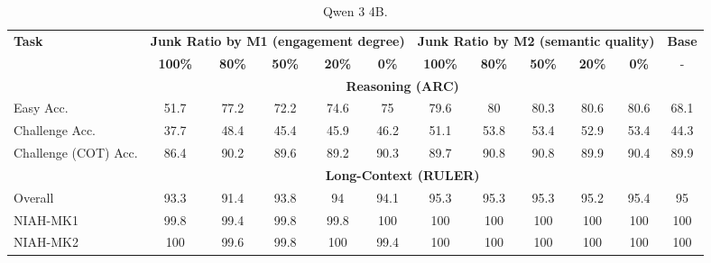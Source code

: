 \begin{table}[ht]
\centering
\scriptsize
\caption{Qwen 3 4B.}
\label{tab:benchmark_qwen3_4b_full}
\setlength{\tabcolsep}{6pt}
\begin{tabular}{l|ccccc|ccccc|c}
\toprule
\multirow{2}{*}{\textbf{Task}}  & \multicolumn{5}{c|}{\textbf{Junk Ratio by M1 (engagement degree)}} & \multicolumn{5}{c|}{\textbf{Junk Ratio by M2 (semantic quality)}} & \textbf{Base} \\
 & \textbf{100\%} & \textbf{80\%} & \textbf{50\%} & \textbf{20\%} & \textbf{0\%} & \textbf{100\%} & \textbf{80\%} & \textbf{50\%} & \textbf{20\%} & \textbf{0\%} & - \\
\midrule
&\multicolumn{10}{c}{\textbf{Reasoning (ARC)}}\\
Easy Acc. & \cellcolor{myred!90} 51.7 & \cellcolor{royalblue!50} 77.2 & \cellcolor{royalblue!22} 72.2 & \cellcolor{royalblue!35} 74.6 & \cellcolor{royalblue!38} 75 & \cellcolor{royalblue!63} 79.6 & \cellcolor{royalblue!65} 80 & \cellcolor{royalblue!67} 80.3 & \cellcolor{royalblue!68} 80.6 & \cellcolor{royalblue!68} 80.6 & 68.1 \\
Challenge Acc. & \cellcolor{myred!62} 37.7 & \cellcolor{royalblue!39} 48.4 & \cellcolor{royalblue!11} 45.4 & \cellcolor{royalblue!15} 45.9 & \cellcolor{royalblue!19} 46.2 & \cellcolor{royalblue!65} 51.1 & \cellcolor{royalblue!90} 53.8 & \cellcolor{royalblue!87} 53.4 & \cellcolor{royalblue!82} 52.9 & \cellcolor{royalblue!87} 53.4 & 44.3 \\
Challenge (COT) Acc. & \cellcolor{myred!90} 86.4 & \cellcolor{royalblue!6} 90.2 & \cellcolor{myred!9} 89.6 & \cellcolor{myred!18} 89.2 & \cellcolor{royalblue!9} 90.3 & \cellcolor{myred!6} 89.7 & \cellcolor{royalblue!22} 90.8 & \cellcolor{royalblue!22} 90.8 & 89.9 & \cellcolor{royalblue!11} 90.4 & 89.9 \\
\midrule
&\multicolumn{10}{c}{\textbf{Long-Context (RULER)}}\\
Overall & \cellcolor{myred!43} 93.3 & \cellcolor{myred!90} 91.4 & \cellcolor{myred!30} 93.8 & \cellcolor{myred!25} 94 & \cellcolor{myred!22} 94.1 & \cellcolor{royalblue!8} 95.3 & \cellcolor{royalblue!8} 95.3 & \cellcolor{royalblue!8} 95.3 & \cellcolor{royalblue!5} 95.2 & \cellcolor{royalblue!9} 95.4 & 95 \\
NIAH-MK1 & \cellcolor{myred!30} 99.8 & \cellcolor{myred!90} 99.4 & \cellcolor{myred!30} 99.8 & \cellcolor{myred!30} 99.8 & 100 & 100 & 100 & 100 & 100 & 100 & 100 \\
NIAH-MK2 & 100 & \cellcolor{myred!60} 99.6 & \cellcolor{myred!30} 99.8 & 100 & \cellcolor{myred!90} 99.4 & 100 & 100 & 100 & 100 & 100 & 100 \\

\end{tabular}
\end{table}
